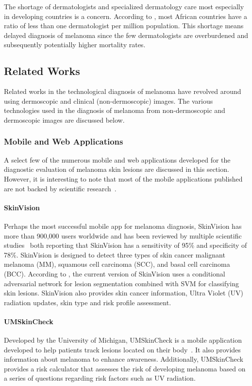 \documentclass[12pt, a4paper]{article}
\begin{document}
The shortage of dermatologists and specialized dermatology care most especially in developing countries is a concern. According to \cite{mosam2021dermatology}, most African countries have a ratio of less than one dermatologist per million population. This shortage means delayed diagnosis of melanoma since the few dermatologists are overburdened and subsequently potentially higher mortality rates.
\subsection{Related Works}
Related works in the technological diagnosis of melanoma have revolved around using dermoscopic and clinical (non-dermoscopic) images. The various technologies used in the diagnosis of melanoma from non-dermoscopic and dermoscopic images are discussed below.
\subsubsection{Mobile and Web Applications}
A select few of the numerous mobile and web applications developed for the diagnostic evaluation of melanoma skin lesions are discussed in this section. However, it is interesting to note that most of the mobile applications published are not backed by scientific research~\citep{okur2018survey}.
\paragraph{SkinVision}
Perhaps the most successful mobile app for melanoma diagnosis, SkinVision has more than 900,000 users worldwide and has been reviewed by multiple scientific studies~\citep{udrea2020accuracy, de2019development} both reporting that SkinVision has a sensitivity of 95\% and specificity of 78\%. SkinVision is designed to detect three types of skin cancer malignant
melanoma (MM), squamous cell carcinoma (SCC), and basal cell carcinoma (BCC). According to \cite{udrea2020accuracy}, the current version of SkinVision uses a conditional adversarial network for lesion segmentation combined with SVM for classifying skin lesions. SkinVision also provides skin cancer information, Ultra Violet (UV) radiation updates, skin type and risk profile assessment.
\paragraph{UMSkinCheck}
Developed by the University of Michigan, UMSkinCheck is a mobile application developed to help patients track lesions located on their body~\citep{kassianos2015smartphone}. It also provides information about melanoma to enhance awareness. Additionally, UMSkinCheck provides a risk calculator that assesses the risk of developing melanoma based on a series of questions regarding risk factors such as UV radiation.
\end{document}
